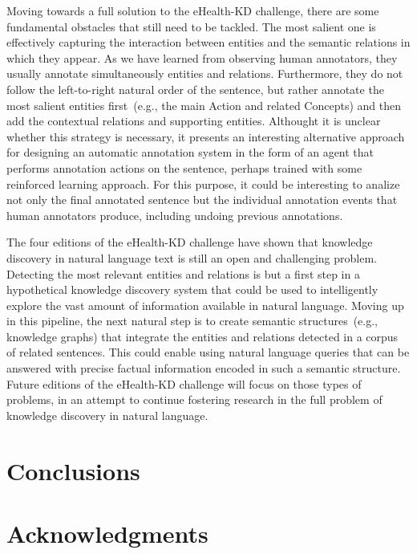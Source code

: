 \documentclass[a4paper,11pt,twocolumn,twoside]{article}
\begin{document}
Moving towards a full solution to the eHealth-KD challenge, there are some fundamental obstacles that still need to be tackled.
The most salient one is effectively capturing the interaction between entities and the semantic relations in which they appear.
As we have learned from observing human annotators, they usually annotate simultaneously entities and relations.
Furthermore, they do not follow the left-to-right natural order of the sentence, but rather annotate the most salient entities first~(e.g., the main Action and related Concepts) and then add the contextual relations and supporting entities.
Althought it is unclear whether this strategy is necessary, it presents an interesting alternative approach for designing an automatic annotation system in the form of an agent that performs annotation actions on the sentence, perhaps trained with some reinforced learning approach.
For this purpose, it could be interesting to analize not only the final annotated sentence but the individual annotation events that human annotators produce, including undoing previous annotations.

The four editions of the eHealth-KD challenge have shown that knowledge discovery in natural language text is still an open and challenging problem.
Detecting the most relevant entities and relations is but a first step in a hypothetical knowledge discovery system that could be used to intelligently explore the vast amount of information available in natural language.
Moving up in this pipeline, the next natural step is to create semantic structures~(e.g., knowledge graphs) that integrate the entities and relations detected in a corpus of related sentences.
This could enable using natural language queries that can be answered with precise factual information encoded in such a semantic structure.
Future editions of the eHealth-KD challenge will focus on those types of problems, in an attempt to continue fostering research in the full problem of knowledge discovery in natural language.

\section{Conclusions}\label{sec:conclusions}

\section*{Acknowledgments}



\end{document}

